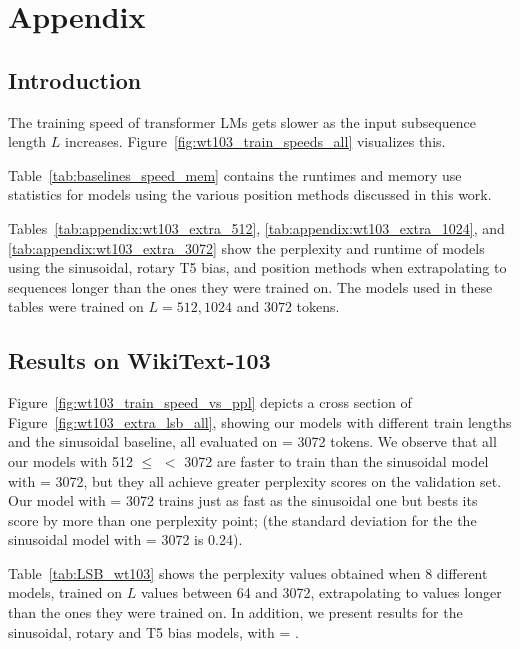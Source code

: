 \appendix
\section{Appendix}
\label{sec:appendix}


\subsection{Introduction}

The training speed of transformer LMs gets slower as the input subsequence length $L$ increases. Figure~\ref{fig:wt103_train_speeds_all} visualizes this.



Table~\ref{tab:baselines_speed_mem} contains the runtimes and memory use statistics for models using the various position methods discussed in this work. 

Tables~\ref{tab:appendix:wt103_extra_512}, \ref{tab:appendix:wt103_extra_1024}, and \ref{tab:appendix:wt103_extra_3072} show the perplexity and runtime of models using the sinusoidal, rotary T5 bias, and \al position methods when extrapolating to sequences longer than the ones they were trained on. The models used in these tables were trained on $L = 512, 1024$ and $3072$ tokens. 



\clearpage 
\subsection{\al Results on WikiText-103}


Figure~\ref{fig:wt103_train_speed_vs_ppl} depicts a cross section of Figure~\ref{fig:wt103_extra_lsb_all}, showing our models with different train lengths and the sinusoidal baseline, all evaluated on \li = 3072 tokens. We observe that all our models with 512 $\leq$  \lt $<$ 3072 are faster to train than the sinusoidal model with \lt = 3072, 
but they all achieve greater perplexity scores on the validation set. Our model with \lt = 3072 trains just as fast as the sinusoidal one but bests its score by more than one perplexity point; (the standard deviation for the the sinusoidal model with \lt = 3072 is 0.24). 


Table~\ref{tab:LSB_wt103} shows the perplexity values obtained when 8 different \al models, trained on $L$ values between 64 and 3072, extrapolating to \li values longer than the ones they were trained on. In addition, we present results for the sinusoidal, rotary and T5 bias models, with \li = \lt. 



